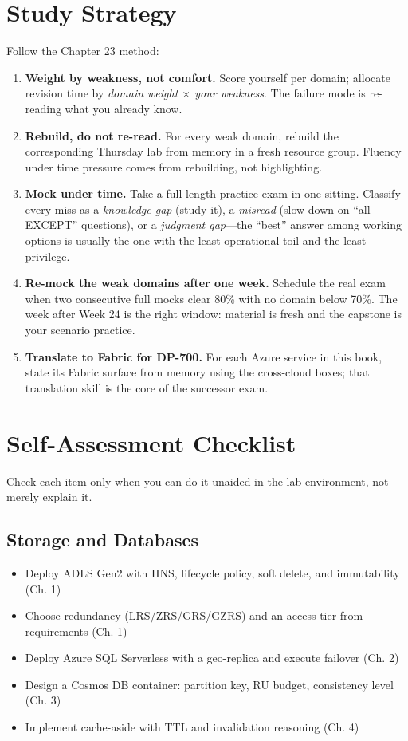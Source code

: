\section{Study Strategy}
%
Follow the Chapter 23 method:

\begin{enumerate}
    \item \textbf{Weight by weakness, not comfort.} Score yourself per domain; allocate revision
    time by \emph{domain weight $\times$ your weakness}. The failure mode is re-reading what you
    already know.
    \item \textbf{Rebuild, do not re-read.} For every weak domain, rebuild the corresponding
    Thursday lab from memory in a fresh resource group. Fluency under time pressure comes from
    rebuilding, not highlighting.
    \item \textbf{Mock under time.} Take a full-length practice exam in one sitting. Classify
    every miss as a \emph{knowledge gap} (study it), a \emph{misread} (slow down on ``all
    EXCEPT'' questions), or a \emph{judgment gap}---the ``best'' answer among working options is
    usually the one with the least operational toil and the least privilege.
    \item \textbf{Re-mock the weak domains after one week.} Schedule the real exam when two
    consecutive full mocks clear 80\% with no domain below 70\%. The week after Week 24 is the
    right window: material is fresh and the capstone is your scenario practice.
    \item \textbf{Translate to Fabric for DP-700.} For each Azure service in this book, state its
    Fabric surface from memory using the cross-cloud boxes; that translation skill is the core of
    the successor exam.
\end{enumerate}

\section{Self-Assessment Checklist}
%
Check each item only when you can do it unaided in the lab environment, not merely explain it.

\subsection*{Storage and Databases}
\begin{itemize}
    \item[$\square$] Deploy ADLS Gen2 with HNS, lifecycle policy, soft delete, and immutability (Ch. 1)
    \item[$\square$] Choose redundancy (LRS/ZRS/GRS/GZRS) and an access tier from requirements (Ch. 1)
    \item[$\square$] Deploy Azure SQL Serverless with a geo-replica and execute failover (Ch. 2)
    \item[$\square$] Design a Cosmos DB container: partition key, RU budget, consistency level (Ch. 3)
    \item[$\square$] Implement cache-aside with TTL and invalidation reasoning (Ch. 4)
\end{itemize}

